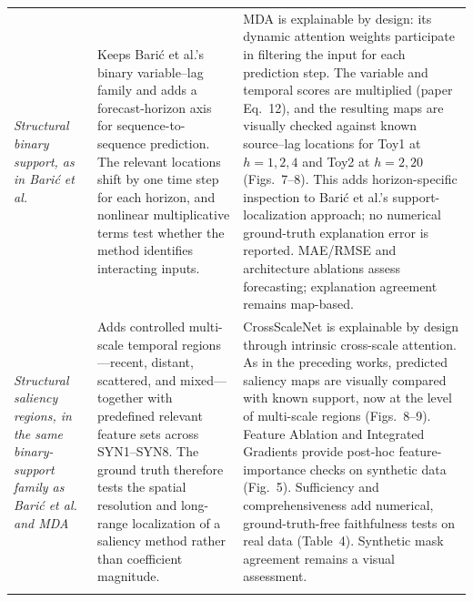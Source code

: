 \begin{longtable}{@{}
>{\raggedright\arraybackslash}p{}
>{\raggedright\arraybackslash}p{}
>{\raggedright\arraybackslash}p{}@{}}
\emph{Structural binary support, as in Bari\'c et al.} &
Keeps Bari\'c et al.'s binary variable--lag family and adds a forecast-horizon
axis for sequence-to-sequence prediction. The relevant locations shift by one
time step for each horizon, and nonlinear multiplicative terms test whether the
method identifies interacting inputs. &
MDA is explainable by design: its dynamic attention weights participate in
filtering the input for each prediction step. The variable and temporal scores
are multiplied (paper Eq.~12), and the resulting maps are visually checked
against known source--lag locations for Toy1 at $h=1,2,4$ and Toy2 at
$h=2,20$ (Figs.~7--8). This adds horizon-specific inspection to Bari\'c et
al.'s support-localization approach; no numerical ground-truth explanation
error is reported. MAE/RMSE and architecture ablations assess forecasting;
explanation agreement remains map-based. \\
\addlinespace

\citet{delibasoglu2025crossscale}

\emph{Structural saliency regions, in the same binary-support family as Bari\'c
et al. and MDA} &
Adds controlled multi-scale temporal regions---recent, distant, scattered, and
mixed---together with predefined relevant feature sets across SYN1--SYN8. The
ground truth therefore tests the spatial resolution and long-range localization
of a saliency method rather than coefficient magnitude. &
CrossScaleNet is explainable by design through intrinsic cross-scale attention.
As in the preceding works, predicted saliency maps are visually compared with
known support, now at the level of multi-scale regions (Figs.~8--9). Feature
Ablation and Integrated Gradients provide post-hoc feature-importance checks
on synthetic data (Fig.~5). Sufficiency and comprehensiveness add numerical,
ground-truth-free faithfulness tests on real data (Table~4). Synthetic
mask agreement remains a visual assessment. \\
\addlinespace

\citet{hertel2026shapformer}


\end{longtable}
